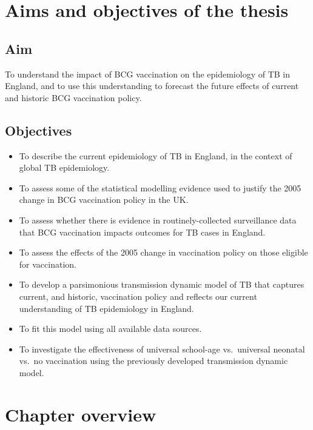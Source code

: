 \documentclass[11pt,twoside]{bristolthesis}
\providecommand{\tightlist}{%
  \setlength{\itemsep}{0pt}\setlength{\parskip}{0pt}}
\begin{document}
  \hypertarget{aims-and-objectives-of-the-thesis}{%
  \section{Aims and objectives of the thesis}\label{aims-and-objectives-of-the-thesis}}
  
  \hypertarget{aim}{%
  \subsection{Aim}\label{aim}}
  
  To understand the impact of BCG vaccination on the epidemiology of TB in England, and to use this understanding to forecast the future effects of current and historic BCG vaccination policy.
  
  \hypertarget{objectives}{%
  \subsection{Objectives}\label{objectives}}
  \begin{itemize}
  \tightlist
  \item
    To describe the current epidemiology of TB in England, in the context of global TB epidemiology.
  \item
    To assess some of the statistical modelling evidence used to justify the 2005 change in BCG vaccination policy in the UK.
  \item
    To assess whether there is evidence in routinely-collected surveillance data that BCG vaccination impacts outcomes for TB cases in England.
  \item
    To assess the effects of the 2005 change in vaccination policy on those eligible for vaccination.
  \item
    To develop a parsimonious transmission dynamic model of TB that captures current, and historic, vaccination policy and reflects our current understanding of TB epidemiology in England.
  \item
    To fit this model using all available data sources.
  \item
    To investigate the effectiveness of universal school-age vs.~universal neonatal vs.~no vaccination using the previously developed transmission dynamic model.
  \end{itemize}
  \hypertarget{chapter-overview}{%
  \section{Chapter overview}\label{chapter-overview}}
\end{document}
